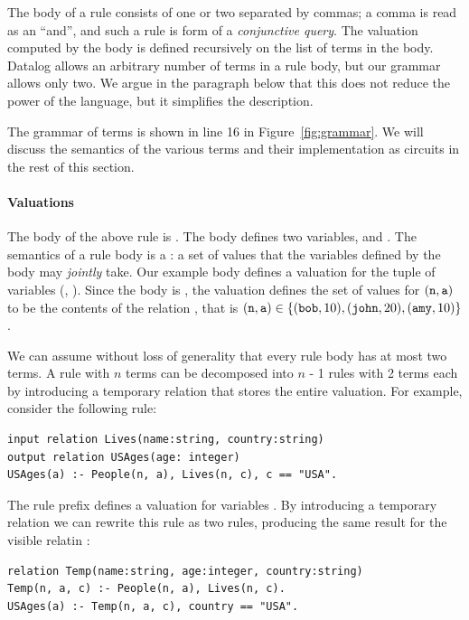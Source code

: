 The body of a rule consists of one or two  separated by commas;
a comma is read as an ``and'', and such a rule is form of a \emph{conjunctive query}.
The valuation computed by the body is defined recursively on the list of terms
in the body.  Datalog allows an arbitrary number of terms in a rule body,
but our grammar allows only two.  We argue in the paragraph below that
this does not reduce the power of the language, but it simplifies the
description.

The grammar of terms is shown in line 16 in Figure~\ref{fig:grammar}.  We will discuss
the semantics of the various terms and their implementation as circuits in the rest of this section.

\paragraph{Valuations}

The body of the above rule is .  The body defines
two variables,  and .
The semantics of a rule body is a :
a set of values that the variables defined by the body may \emph{jointly} take.
Our example body defines a valuation for the tuple of variables (, ).
Since the body is , the valuation defines the set of values for $(\mbox{\texttt{n}},\mbox{\texttt{a}})$
to be the contents of the relation , that is $(\mbox{\texttt{n}},\mbox{\texttt{a}}) \in \{ (\mbox{\texttt{bob}}, 10),
(\mbox{\texttt{john}},20), (\mbox{\texttt{amy}}, 10) \}$.

We can assume without loss of generality that every rule body has at most two terms.
A rule with $n$ terms can be decomposed into $n$ - 1 rules with 2 terms each by introducing
a temporary relation that stores the entire valuation.
For example, consider the following rule:

\begin{lstlisting}[language=ddlog]
input relation Lives(name:string, country:string)
output relation USAges(age: integer)
USAges(a) :- People(n, a), Lives(n, c), c == "USA".
\end{lstlisting}

The rule prefix  defines a valuation for
variables .  By introducing a temporary relation
 we can rewrite this rule as two rules, producing the same
result for the visible relatin :

\begin{lstlisting}[language=ddlog]
relation Temp(name:string, age:integer, country:string)
Temp(n, a, c) :- People(n, a), Lives(n, c).
USAges(a) :- Temp(n, a, c), country == "USA".
\end{lstlisting}

